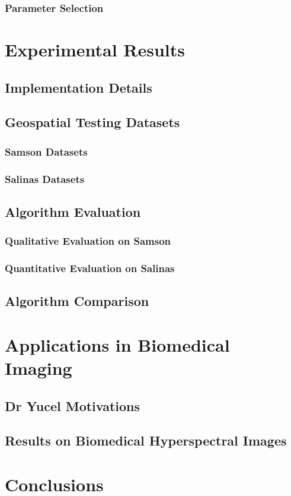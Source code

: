 \documentclass{article}
\begin{document}
\subsubsection{Parameter Selection}

\clearpage
% 
% 
% 
% 
% 
\section{Experimental Results}

\subsection{Implementation Details}

\clearpage
\subsection{Geospatial Testing Datasets}
\subsubsection{Samson Datasets}
\subsubsection{Salinas Datasets}

\clearpage
\subsection{Algorithm Evaluation}
\subsubsection{Qualitative Evaluation on Samson}
\subsubsection{Quantitative Evaluation on Salinas}

\clearpage
\subsection{Algorithm Comparison}

\clearpage
% 
% 
% 
% 
% 
\section{Applications in Biomedical Imaging}

\subsection{Dr Yucel Motivations}
\subsection{Results on Biomedical Hyperspectral Images}

\clearpage
% 
% 
% 
% 
% 
\section{Conclusions}
\end{document}
